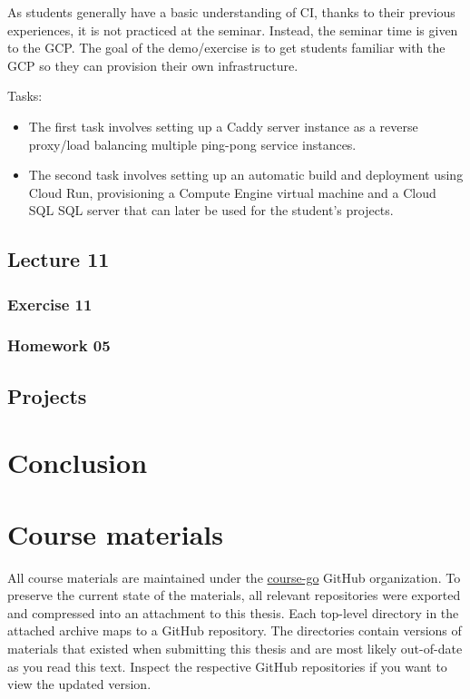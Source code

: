 \documentclass[
  digital,
  color,
  oneside,
  nosansbold,
  nocolorbold,
  lof,
  lot,
]{fithesis4}
\begin{document}
As students generally have a basic understanding of CI, thanks to their previous experiences, it is not practiced at the seminar. Instead, the seminar time is given to the GCP. The goal of the demo/exercise is to get students familiar with the GCP so they can provision their own infrastructure.

Tasks:
\begin{itemize}
    \item The first task involves setting up a Caddy server instance as a reverse proxy/load balancing multiple ping-pong service instances.
    \item The second task involves setting up an automatic build and deployment using Cloud Run, provisioning a Compute Engine virtual machine and a Cloud SQL SQL server that can later be used for the student's projects.
\end{itemize}
    
\section{Lecture 11}

\subsection{Exercise 11}

\subsection{Homework 05}

\section{Projects}

\chapter{Conclusion}

\printbibliography[heading=bibintoc]

\appendix
\chapter{Course materials}

All course materials are maintained under the \href{https://github.com/course-go}{course-go} GitHub organization. To preserve the current state of the materials, all relevant repositories were exported and compressed into an attachment to this thesis. Each top-level directory in the attached archive maps to a GitHub repository. The directories contain versions of materials that existed when submitting this thesis and are most likely out-of-date as you read this text. Inspect the respective GitHub repositories if you want to view the updated version.
\end{document}
